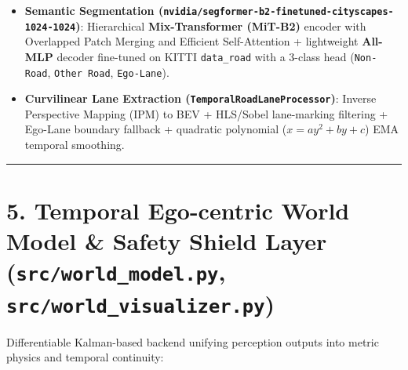 \documentclass[10.5pt,a4paper]{article}
\begin{document}
\begin{itemize}[leftmargin=1.5em,itemsep=2pt]
\item \textbf{Semantic Segmentation (\texttt{nvidia/\allowbreak{}segformer-\allowbreak{}b2-\allowbreak{}finetuned-\allowbreak{}cityscapes-\allowbreak{}1024-\allowbreak{}1024})}: Hierarchical \textbf{Mix-Transformer (MiT-B2)} encoder with Overlapped Patch Merging and Efficient Self-Attention + lightweight \textbf{All-MLP} decoder fine-tuned on KITTI \texttt{data\_\allowbreak{}road} with a 3-class head (\texttt{Non-\allowbreak{}Road}, \texttt{Other Road}, \texttt{Ego-\allowbreak{}Lane}).
\item \textbf{Curvilinear Lane Extraction (\texttt{TemporalRoadLaneProcessor})}: Inverse Perspective Mapping (IPM) to BEV + HLS/Sobel lane-marking filtering + Ego-Lane boundary fallback + quadratic polynomial ($x = a y^2 + b y + c$) EMA temporal smoothing.
\end{itemize}

\par\noindent\rule{\textwidth}{0.4pt}\par\medskip

\section{5. Temporal Ego-centric World Model \& Safety Shield Layer (\texttt{src/\allowbreak{}world\_\allowbreak{}model.\allowbreak{}py}, \texttt{src/\allowbreak{}world\_\allowbreak{}visualizer.\allowbreak{}py})}

Differentiable Kalman-based backend unifying perception outputs into metric physics and temporal continuity:
\end{document}
